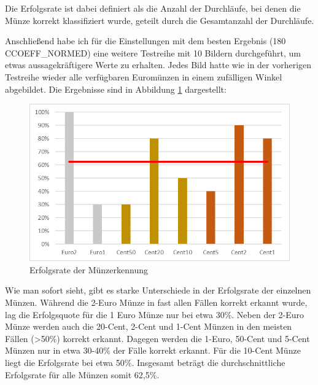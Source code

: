 Die Erfolgsrate ist dabei definiert als die Anzahl der Durchläufe, bei denen die Münze korrekt klassifiziert wurde, geteilt durch die Gesamtanzahl der Durchläufe.

Anschließend habe ich für die Einstellungen mit dem besten Ergebnis (180 CCOEFF\_NORMED) eine weitere Testreihe mit 10 Bildern durchgeführt, um etwas aussagekräftigere Werte zu erhalten. Jedes Bild hatte wie in der vorherigen Testreihe wieder alle verfügbaren Euromünzen in einem zufälligen Winkel abgebildet. Die Ergebnisse sind in Abbildung \ref{fig:SuccessRate} dargestellt:

\begin{figure}[ht]
    \centering
    \caption{Erfolgsrate der Münzerkennung}
    \label{fig:SuccessRate}
    \includegraphics[width=\textwidth]{../SuccessRate2.png}  
\end{figure}

Wie man sofort sieht, gibt es starke Unterschiede in der Erfolgsrate der einzelnen Münzen. Während die 2-Euro Münze in fast allen Fällen korrekt erkannt wurde, lag die Erfolgsquote für die 1 Euro Münze nur bei etwa 30\%. Neben der 2-Euro Münze werden auch die 20-Cent, 2-Cent und 1-Cent Münzen in den meisten Fällen (>50\%) korrekt erkannt. Dagegen werden die 1-Euro, 50-Cent und 5-Cent Münzen nur in etwa 30-40\% der Fälle korrekt erkannt. Für die 10-Cent Münze liegt die Erfolgsrate bei etwa 50\%. Insgesamt beträgt die durchschnittliche Erfolgsrate für alle Münzen somit 62,5\%.